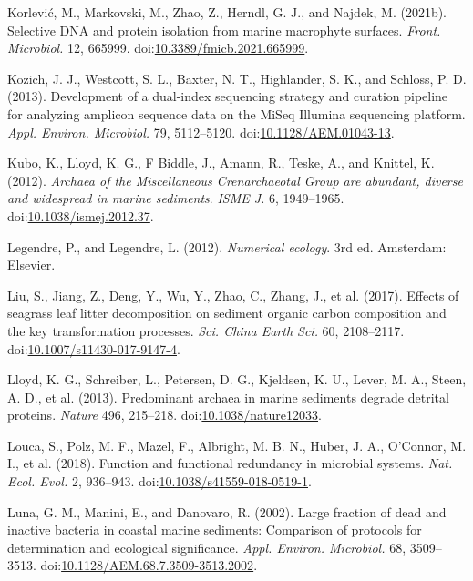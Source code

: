 \documentclass[12pt,]{article}
\begin{document}
\leavevmode\hypertarget{ref-Korlevic2021}{}%
Korlević, M., Markovski, M., Zhao, Z., Herndl, G. J., and Najdek, M.
(2021b). Selective DNA and protein isolation from marine macrophyte
surfaces. \emph{Front. Microbiol.} 12, 665999.
doi:\href{https://doi.org/10.3389/fmicb.2021.665999}{10.3389/fmicb.2021.665999}.

\leavevmode\hypertarget{ref-Kozich2013a}{}%
Kozich, J. J., Westcott, S. L., Baxter, N. T., Highlander, S. K., and
Schloss, P. D. (2013). Development of a dual-index sequencing strategy
and curation pipeline for analyzing amplicon sequence data on the MiSeq
Illumina sequencing platform. \emph{Appl. Environ. Microbiol.} 79,
5112--5120.
doi:\href{https://doi.org/10.1128/AEM.01043-13}{10.1128/AEM.01043-13}.

\leavevmode\hypertarget{ref-Kubo2012}{}%
Kubo, K., Lloyd, K. G., F Biddle, J., Amann, R., Teske, A., and Knittel,
K. (2012). \emph{Archaea \textup{of the Miscellaneous Crenarchaeotal
Group are abundant, diverse and widespread in marine sediments}}.
\emph{ISME J.} 6, 1949--1965.
doi:\href{https://doi.org/10.1038/ismej.2012.37}{10.1038/ismej.2012.37}.

\leavevmode\hypertarget{ref-Legendre2012}{}%
Legendre, P., and Legendre, L. (2012). \emph{Numerical ecology}. 3rd ed.
Amsterdam: Elsevier.

\leavevmode\hypertarget{ref-Liu2017}{}%
Liu, S., Jiang, Z., Deng, Y., Wu, Y., Zhao, C., Zhang, J., et al.
(2017). Effects of seagrass leaf litter decomposition on sediment
organic carbon composition and the key transformation processes.
\emph{Sci. China Earth Sci.} 60, 2108--2117.
doi:\href{https://doi.org/10.1007/s11430-017-9147-4}{10.1007/s11430-017-9147-4}.

\leavevmode\hypertarget{ref-Lloyd2013}{}%
Lloyd, K. G., Schreiber, L., Petersen, D. G., Kjeldsen, K. U., Lever, M.
A., Steen, A. D., et al. (2013). Predominant archaea in marine sediments
degrade detrital proteins. \emph{Nature} 496, 215--218.
doi:\href{https://doi.org/10.1038/nature12033}{10.1038/nature12033}.

\leavevmode\hypertarget{ref-Louca2018}{}%
Louca, S., Polz, M. F., Mazel, F., Albright, M. B. N., Huber, J. A.,
O'Connor, M. I., et al. (2018). Function and functional redundancy in
microbial systems. \emph{Nat. Ecol. Evol.} 2, 936--943.
doi:\href{https://doi.org/10.1038/s41559-018-0519-1}{10.1038/s41559-018-0519-1}.

\leavevmode\hypertarget{ref-Luna2002}{}%
Luna, G. M., Manini, E., and Danovaro, R. (2002). Large fraction of dead
and inactive bacteria in coastal marine sediments: Comparison of
protocols for determination and ecological significance. \emph{Appl.
Environ. Microbiol.} 68, 3509--3513.
doi:\href{https://doi.org/10.1128/AEM.68.7.3509-3513.2002}{10.1128/AEM.68.7.3509-3513.2002}.
\end{document}
